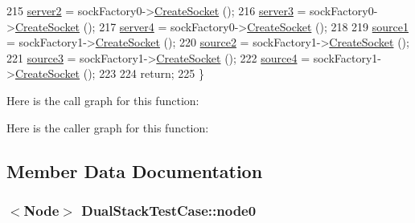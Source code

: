 \begin{DoxyCode}
215   \hyperlink{classDualStackTestCase_a1dec50c747b9b140513d695e4dd3aef6}{server2} = sockFactory0->\hyperlink{classns3_1_1SocketFactory_a97351e6e7860503a4912042530449f62}{CreateSocket} ();
216   \hyperlink{classDualStackTestCase_a35f3bc681d2fc1f54a5a5e7c5530c2da}{server3} = sockFactory0->\hyperlink{classns3_1_1SocketFactory_a97351e6e7860503a4912042530449f62}{CreateSocket} ();
217   \hyperlink{classDualStackTestCase_a151f957a3f71c91cda6ea65e11e5499e}{server4} = sockFactory0->\hyperlink{classns3_1_1SocketFactory_a97351e6e7860503a4912042530449f62}{CreateSocket} ();
218 
219   \hyperlink{classDualStackTestCase_a54b138b91c944a0b15ab29b952b93a4b}{source1} = sockFactory1->\hyperlink{classns3_1_1Socket_ad448a62bb50ad3dbac59c879a885a8d2}{CreateSocket} ();
220   \hyperlink{classDualStackTestCase_a61fd1d32c28557623bf74535044693bb}{source2} = sockFactory1->\hyperlink{classns3_1_1Socket_ad448a62bb50ad3dbac59c879a885a8d2}{CreateSocket} ();
221   \hyperlink{classDualStackTestCase_ab7b8bea54582bc0ce4864dc184348813}{source3} = sockFactory1->\hyperlink{classns3_1_1Socket_ad448a62bb50ad3dbac59c879a885a8d2}{CreateSocket} ();
222   \hyperlink{classDualStackTestCase_af8c2e51627dab5f1189b9339c68aa248}{source4} = sockFactory1->\hyperlink{classns3_1_1Socket_ad448a62bb50ad3dbac59c879a885a8d2}{CreateSocket} ();
223 
224   \textcolor{keywordflow}{return};
225 \}
\end{DoxyCode}


Here is the call graph for this function\+:




Here is the caller graph for this function\+:




\subsection{Member Data Documentation}
\subsubsection[{\texorpdfstring{node0}{node0}}]{$<${\bf Node}$>$ Dual\+Stack\+Test\+Case\+::node0\hspace{0.3cm}{\ttfamily [private]}}\hypertarget{classDualStackTestCase_ac4d4f4cf97719a9909db6702bb6363b6}{}\label{classDualStackTestCase_ac4d4f4cf97719a9909db6702bb6363b6}


